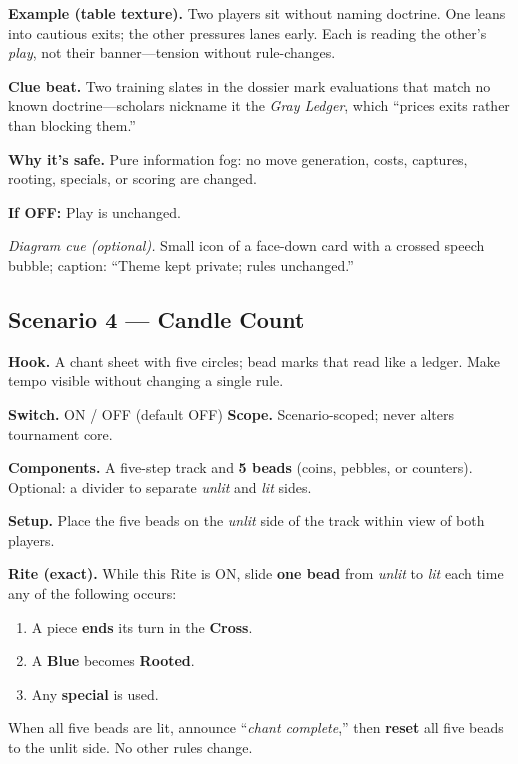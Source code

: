 \documentclass[11pt]{article}
\numberwithin{equation}{section} %
\theoremstyle{plain} %
\theoremstyle{definition} %
\theoremstyle{remark} %
\begin{document}
\medskip
\noindent\textbf{Example (table texture).}  
Two players sit without naming doctrine. One leans into cautious exits; the other pressures lanes early. Each is reading the other’s \emph{play}, not their banner—tension without rule-changes.

\medskip
\noindent\textbf{Clue beat.} Two training slates in the dossier mark evaluations that match no known doctrine—scholars nickname it the \emph{Gray Ledger}, which “prices exits rather than blocking them.”

\medskip
\noindent\textbf{Why it’s safe.} Pure information fog: no move generation, costs, captures, rooting, specials, or scoring are changed.

\medskip
\noindent\textbf{If \textsc{OFF}:} Play is unchanged.

\medskip
\noindent\textit{Diagram cue (optional).} Small icon of a face-down card with a crossed speech bubble; caption: “Theme kept private; rules unchanged.”

\subsection{Scenario 4 — Candle Count}
\label{scen:candle-count}

\noindent\textbf{Hook.} A chant sheet with five circles; bead marks that read like a ledger. Make tempo visible without changing a single rule.

\medskip
\noindent\textbf{Switch.} \textsc{ON / OFF} (default \textsc{OFF}) \hfill \textbf{Scope.} Scenario-scoped; never alters tournament core.

\medskip
\noindent\textbf{Components.} A five-step track and \textbf{5 beads} (coins, pebbles, or counters). Optional: a divider to separate \emph{unlit} and \emph{lit} sides.

\medskip
\noindent\textbf{Setup.} Place the five beads on the \emph{unlit} side of the track within view of both players.

\medskip
\noindent\textbf{Rite (exact).} While this Rite is \textsc{ON}, slide \textbf{one bead} from \emph{unlit} to \emph{lit} each time any of the following occurs:
\begin{enumerate}\setlength\itemsep{0.2em}
  \item A piece \textbf{ends} its turn in the \textbf{Cross}.
  \item A \textbf{Blue} becomes \textbf{Rooted}.
  \item Any \textbf{special} is used.
\end{enumerate}
When all five beads are lit, announce “\textit{chant complete},” then \textbf{reset} all five beads to the unlit side. No other rules change.
\end{document}
